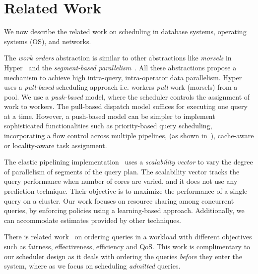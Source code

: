 \section{Related Work}\label{sec:related}
We now describe the related work on scheduling in database systems, operating systems (OS), and networks. %

The \textit{work orders} abstraction is similar to other abstractions like \textit{morsels} in Hyper~\cite{morsel} and the \textit{segment-based parallelism}~\cite{wang2016elastic}. 
All these abstractions propose a mechanism to achieve high intra-query, intra-operator data parallelism.
Hyper~\cite{morsel} uses a \textit{pull-based} scheduling approach i.e. workers \textit{pull} work (morsels) from a pool. 
We use a \textit{push-based} model, where the scheduler controls the assignment of work to workers.
The pull-based dispatch model suffices for executing one query at a time. 
However, a push-based model can be simpler to implement sophisticated functionalities such as priority-based query scheduling, incorporating a flow control across multiple pipelines, (as shown in~\cite{wang2016elastic}), cache-aware or locality-aware task assignment.

The elastic pipelining implementation~\cite{wang2016elastic} uses a \textit{scalability vector} to vary the degree of parallelism of segments of the query plan.
The scalability vector tracks the query performance when number of cores are varied,  and it does not use any prediction technique.
Their objective is to maximize the performance of a single query on a cluster.
Our work focuses on resource sharing among concurrent queries, by enforcing policies using a learning-based approach. 
Additionally, we can accommodate estimates provided by other techniques.

There is related work~\cite{gupta2009fair} on ordering queries in a workload with different objectives such as fairness, effectiveness, efficiency and QoS. 
This work is complimentary to our scheduler design as it deals with ordering the queries \textit{before} they enter the system, where as we focus on scheduling \textit{admitted} queries. 

